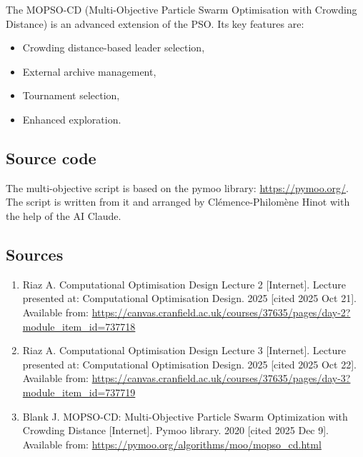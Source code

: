 The MOPSO-CD (Multi-Objective Particle Swarm Optimisation with Crowding Distance) is an advanced extension of the PSO. Its key features are:
\begin{itemize}
    \item Crowding distance-based leader selection,
    \item External archive management,
    \item Tournament selection,
    \item Enhanced exploration.
\end{itemize}

\subsection{Source code}

The multi-objective script is based on the pymoo library: \url{https://pymoo.org/}. The script is written from it and arranged by Clémence-Philomène Hinot with the help of the AI Claude.

\subsection{Sources}

\begin{enumerate}
    \item Riaz A. Computational Optimisation Design Lecture 2 [Internet]. Lecture presented at: Computational Optimisation Design. 2025 [cited 2025 Oct 21]. Available from: \url{https://canvas.cranfield.ac.uk/courses/37635/pages/day-2?module_item_id=737718}
    \item Riaz A. Computational Optimisation Design Lecture 3 [Internet]. Lecture presented at: Computational Optimisation Design. 2025 [cited 2025 Oct 22]. Available from: \url{https://canvas.cranfield.ac.uk/courses/37635/pages/day-3?module_item_id=737719}
    \item Blank J. MOPSO-CD: Multi-Objective Particle Swarm Optimization with Crowding Distance [Internet]. Pymoo library. 2020 [cited 2025 Dec 9]. Available from: \url{https://pymoo.org/algorithms/moo/mopso\_cd.html}
\end{enumerate}
